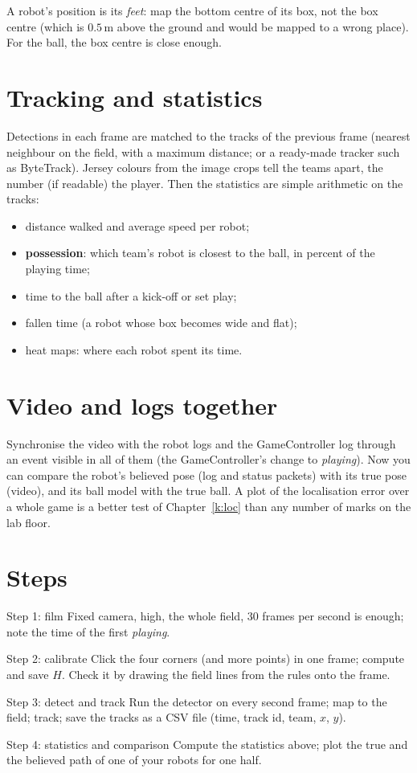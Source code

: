A robot's position is its \emph{feet}: map the bottom centre of its box, not the box centre (which is $0.5$\,m above the ground and would be mapped to a wrong place). For the ball, the box centre is close enough.

\section*{Tracking and statistics}
Detections in each frame are matched to the tracks of the previous frame (nearest neighbour on the field, with a maximum distance; or a ready-made tracker such as ByteTrack). Jersey colours from the image crops tell the teams apart, the number (if readable) the player. Then the statistics are simple arithmetic on the tracks:
\begin{itemize}[nosep]
  \item distance walked and average speed per robot;
  \item \textbf{possession}: which team's robot is closest to the ball, in percent of the playing time;
  \item time to the ball after a kick-off or set play;
  \item fallen time (a robot whose box becomes wide and flat);
  \item heat maps: where each robot spent its time.
\end{itemize}

\section*{Video and logs together}
Synchronise the video with the robot logs and the GameController log through an event visible in all of them (the GameController's change to \emph{playing}). Now you can compare the robot's believed pose (log and status packets) with its true pose (video), and its ball model with the true ball. A plot of the localisation error over a whole game is a better test of Chapter~\ref{k:loc} than any number of marks on the lab floor.

\section*{Steps}
\begin{stepbox}{Step 1: film}
Fixed camera, high, the whole field, $30$ frames per second is enough; note the time of the first \emph{playing}.
\end{stepbox}
\begin{stepbox}{Step 2: calibrate}
Click the four corners (and more points) in one frame; compute and save $H$. Check it by drawing the field lines from the rules onto the frame.
\end{stepbox}
\begin{stepbox}{Step 3: detect and track}
Run the detector on every second frame; map to the field; track; save the tracks as a CSV file (time, track id, team, $x$, $y$).
\end{stepbox}
\begin{stepbox}{Step 4: statistics and comparison}
Compute the statistics above; plot the true and the believed path of one of your robots for one half.
\end{stepbox}

